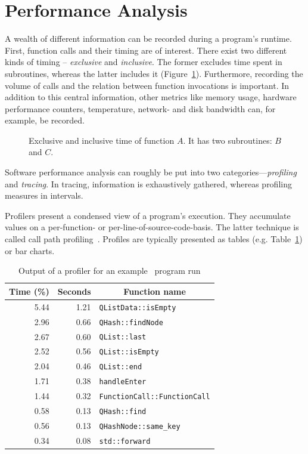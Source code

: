 \documentclass[a4paper, final, diplominf]{zih-template}
\begin{document}
\section{Performance Analysis}
\label{sec:background-performance}
A wealth of different information can be recorded during a program's runtime.
First, function calls and their timing are of interest.
There exist two different kinds of timing -- \emph{exclusive} and \emph{inclusive}.
The former excludes time spent in subroutines, whereas the latter includes it (Figure~\ref{fig:exclusive-inclusive-execution-time}).
Furthermore, recording the volume of calls and the relation between function invocations is important.
In addition to this central information, other metrics like memory usage, hardware performance counters, temperature, network- and disk bandwidth can, for example, be recorded.
\begin{figure}[tbh]
	\centering
	
	\caption{Exclusive and inclusive time of function $A$. It has two subroutines: $B$ and $C$.}
	\label{fig:exclusive-inclusive-execution-time}
\end{figure}

Software performance analysis can roughly be put into two categories---\emph{profiling} and \emph{tracing}.
In tracing, information is exhaustively gathered, whereas profiling measures in intervals.

Profilers present a condensed view of a program's execution.
They accumulate values on a per-function- or per-line-of-source-code-basis.
The latter technique is called call path profiling~\cite{hall92}.
Profiles are typically presented as tables (e.g. Table~\ref{tab:gprof}) or bar charts.
\begin{table}[tbh]
	\centering
	\caption{Output of a profiler for an example \cpp~program run}
	\vspace{0.2cm}
	\begin{tabular}{r r | l}
		\multicolumn{1}{c}{\textbf{Time (\%)}} &
		\multicolumn{1}{c|}{\textbf{Seconds}} &
		\multicolumn{1}{c}{\textbf{Function name}} \\

		\hline

		5.44 & 1.21 & \texttt{QListData::isEmpty} \\
		2.96 & 0.66 & \texttt{QHash::findNode} \\
		2.67 & 0.60 & \texttt{QList::last} \\
		2.52 & 0.56 & \texttt{QList::isEmpty} \\
		2.04 & 0.46 & \texttt{QList::end} \\
		1.71 & 0.38 & \texttt{handleEnter} \\
		1.44 & 0.32 & \texttt{FunctionCall::FunctionCall} \\
		0.58 & 0.13 & \texttt{QHash::find} \\
		0.56 & 0.13 & \texttt{QHashNode::same\_key} \\
		0.34 & 0.08 & \texttt{std::forward} \\
	\end{tabular}
	\label{tab:gprof}
\end{table}
\end{document}
